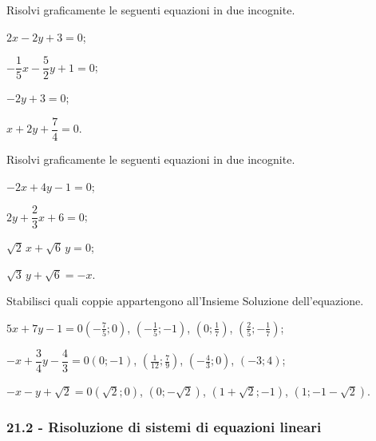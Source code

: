 \begin{esercizio}
 \label{ese:21.4}
Risolvi graficamente le seguenti equazioni in due incognite.
\begin{multicols}{2}
 \begin{enumeratea}
\spazielenx
\item $2x-2y+3=0$;
\item $-{\dfrac{1}{5}}x-\dfrac{5}{2}y+1=0$;
\item $-2y+3=0$;
\item $x+2y+\dfrac{7}{4}=0$.
\end{enumeratea}
\end{multicols}
\end{esercizio}

\begin{esercizio}
 \label{ese:21.5}
Risolvi graficamente le seguenti equazioni in due incognite.
\begin{multicols}{2}
 \begin{enumeratea}
\spazielenx
\item $-2x+4y-1=0$;
\item $2y+\dfrac{2}{3}x+6=0$;
\item $\sqrt{2}\,x+\sqrt{6}\,y=0$;
\item $\sqrt{3}\,y+\sqrt{6}=-x$.
 \end{enumeratea}
\end{multicols}
\end{esercizio}

\begin{esercizio}
 \label{ese:21.6}
 Stabilisci quali coppie appartengono all'Insieme Soluzione dell'equazione.
\TabPositions{4cm}
\begin{enumeratea}
\item $5x+7y-1=0$\tab$\left(-\frac{7}{5};0\right)$, $\left(-\frac{1}{5};-1\right)$, $\left(0;\frac{1}{7}\right)$, $\left(\frac{2}{5};-\frac{1}{7}\right)$;
\item $-x+\dfrac{3}{4}y-\dfrac{4}{3}=0$\tab$(0;-1)$, $\left(\frac{1}{12};\frac{7}{9}\right)$, $\left(-\frac{4}{3};0\right)$, $(-3;4)$;
\item $-x-y+\sqrt{2}=0$\tab$\left(\sqrt{2};0\right)$, $\left(0;-\sqrt{2}\right)$, $\left(1+\sqrt{2};-1\right)$, $\left(1;-1-\sqrt{2}\right)$.
\end{enumeratea}
\end{esercizio}

\subsubsection*{21.2 - Risoluzione di sistemi di equazioni lineari}

